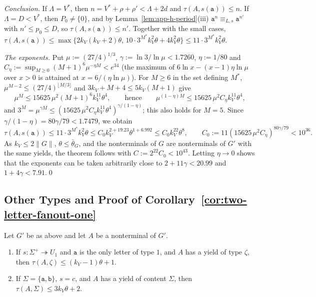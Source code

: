 \emph{Conclusion.}  If $\Lambda=V^*$, then $n=V^*+\rho+\rho'<\Lambda+2d$ and
$\tau(A,s(\mathtt a))\le n$.  If $\Lambda=D<V^*$, then $P_0\ne\{0\}$, and by
Lemma~\ref{lem:app-h-period}(iii) $\mathtt a^n\equiv_{L,s}\mathtt a^{n'}$ with
$n'\le p_0\le D$, so $\tau(A,s(\mathtt a))\le n'$.  Together with the small cases,
$\tau(A,s(\mathtt a))\le\max\{2k_V(k_V+2)\theta,\,10\cdot3^{M^*}k_V^2\theta+4k_V^2\theta\}
\le11\cdot3^{M^*}k_V^2\theta$.

\emph{The exponents.}  Put $\mu:=(27/4)^{1/3}$, $\gamma:=\ln3/\ln\mu<1.7260$,
$\eta:=1/80$ and $C_\eta:=\sup_{M\ge0}(M+1)^6\mu^{-\eta M}<e^{34}$ (the maximum of
$6\ln x-(x-1)\eta\ln\mu$ over $x>0$ is attained at $x=6/(\eta\ln\mu)$).  For $M\ge6$
in the set defining $M^*$, $\mu^{M-2}\le(27/4)^{\lfloor M/3\rfloor}$ and
$3k_V+M+4\le5k_V(M+1)$ give
\[
 \mu^M\le15625\,\mu^2(M+1)^6k_V^{11}\theta^4,\qquad\text{hence}\qquad
 \mu^{(1-\eta)M}\le15625\,\mu^2C_\eta k_V^{11}\theta^4,
\]
and $3^M=\mu^{\gamma M}\le(15625\,\mu^2C_\eta k_V^{11}\theta^4)^{\gamma/(1-\eta)}$;
this also holds for $M=5$.  Since $\gamma/(1-\eta)=80\gamma/79<1.7479$, we obtain
\[
 \tau(A,s(\mathtt a))\le11\cdot3^{M^*}k_V^2\theta\le C_0k_V^{2+19.23}\theta^{1+6.992}
 \le C_0k_V^{22}\theta^8,\qquad C_0:=11(15625\,\mu^2C_\eta)^{80\gamma/79}<10^{36}.
\]
As $k_V\le2\|G\|$, $\theta\le\bar\theta_G$, and the nonterminals of $G$ are
nonterminals of $G'$ with the same yields, the theorem follows with
$C:=2^{22}C_0<10^{43}$.  Letting $\eta\to0$ shows that the exponents can be taken
arbitrarily close to $2+11\gamma<20.99$ and $1+4\gamma<7.91$.\qed

\subsection{Other Types and Proof of Corollary~\ref{cor:two-letter-fanout-one}}

\begin{lemma}
\label{lem:app-h-other}
Let $G'$ be as above and let $A$ be a nonterminal of $G'$.
\begin{enumerate}[label=\textup{(\roman*)},leftmargin=*]
\item If $s:\Sigma^+\twoheadrightarrow U_1$ and $\mathtt a$ is the only letter of
type $1$, and $A$ has a yield of type $\zeta$, then
$\tau(A,\zeta)\le(k_V-1)\theta+1$.
\item If $\Sigma=\{\mathtt a,\mathtt b\}$, $s=c$, and $A$ has a yield of content
$\Sigma$, then $\tau(A,\Sigma)\le3k_V\theta+2$.
\end{enumerate}
\end{lemma}

